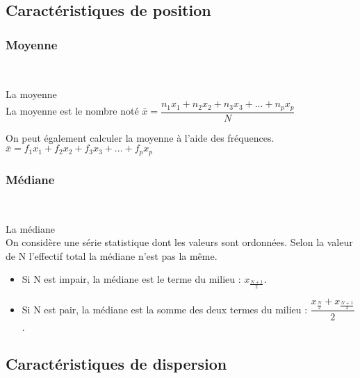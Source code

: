 \documentclass[paper=a4, fontsize=9pt]{scrartcl} %
\begin{document}
\subsection{Caractéristiques de position}

\begin{multicols}{2}
  \subsubsection{Moyenne}~~\\

  \begin{Definition} La moyenne\\
    La moyenne est le nombre noté $\bar{x} = \dfrac{n_1 x_1 + n_2 x_2 + n_3 x_3 + ... + n_p x_p}{N}$\\
  \end{Definition}

  \begin{Proposition}
    On peut également calculer la moyenne à l'aide des fréquences.\\
    $\bar{x} = f_1 x_1 + f_2 x_2 + f_3 x_3 + ... + f_p x_p$\\
  \end{Proposition}

  \subsubsection{Médiane}~~\\

  \begin{Definition}La médiane\\
    On considère une série statistique dont les valeurs sont ordonnées. Selon la valeur de N l'effectif total la médiane n'est pas la même.
    \begin{itemize}
    \item Si N est impair, la médiane est le terme du milieu : $x_{\frac{N + 1}{2}}$.
    \item Si N est pair, la médiane est la somme des deux termes du milieu : $\dfrac{x_{\frac{N}{2}} + x_{\frac{N+1}{2}}}{2}$.
    \end{itemize}
  \end{Definition}
\end{multicols}
\subsection{Caractéristiques de dispersion}
\end{document}
